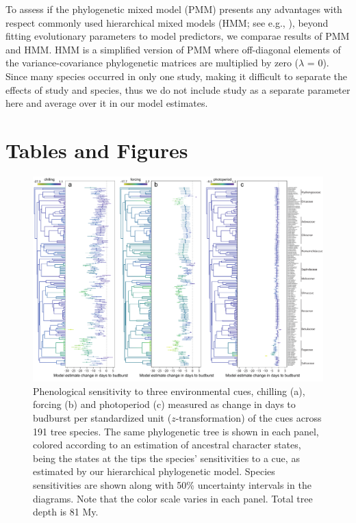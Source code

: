 \documentclass[11pt]{article}
\begin{document}
To assess if the phylogenetic mixed model (PMM) presents any advantages with respect commonly used hierarchical mixed models (HMM; see e.g., \cite{ettinger2020}), beyond fitting evolutionary parameters to model predictors, we comparae results of PMM and HMM. HMM is a simplified version of PMM where off-diagonal elements of the variance-covariance phylogenetic matrices are multiplied by zero ($\lambda$ = 0). Since many species occurred in only one study, making it difficult to separate the effects of study and species, thus we do not include study as a separate parameter here and average over it in our model estimates.






\clearpage
\section*{Tables and Figures} 


\begin{figure} 
  \begin{center}
  \includegraphics[width=16cm]{../../analyses/phylogeny/figures/Fig1_phylo_muplots191_clades.pdf}
  \caption{Phenological sensitivity to three environmental cues, chilling (a), forcing (b) and photoperiod (c) measured as change in days to budburst per standardized unit ($z$-transformation) of the cues across 191 tree species. The same phylogenetic tree is shown in each panel, colored according to an estimation of ancestral character states, being the states at the tips the species' sensitivities to a cue, as estimated by our hierarchical phylogenetic model. Species sensitivities are shown along with 50\% uncertainty intervals in the diagrams. Note that the color scale varies in each panel. Total tree depth is 81 My.}
  \label{fig:muplot_all}
  \end{center}
\end{figure}
\end{document}
